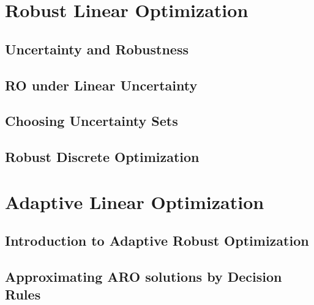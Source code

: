 \documentclass{bookest}
\begin{document}
%		
%	
%	
%	
%	
%	
	

	\part{Robust Linear Optimization}
	
	\chapter{Uncertainty and Robustness} \label{chapter_1}
	
	
	\chapter{RO under Linear Uncertainty} \label{chapter3-2}
	
	
	\chapter{Choosing Uncertainty Sets} \label{chapter_3}
	
	
	\chapter{Robust Discrete Optimization} \label{chapter_3}
	
	
	\part{Adaptive Linear Optimization}
	
	\chapter{Introduction to Adaptive Robust Optimization} 
	
	
	\chapter{Approximating ARO solutions by Decision Rules} 
	
	
\end{document}
